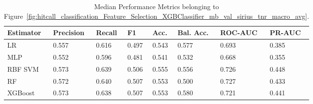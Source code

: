 \begin{longtable}{llllllll}
\caption{Median Performance Metrics belonging to Figure~\ref{fig:hitcall_classification_Feature_Selection_XGBClassifier_mb_val_sirius_tnr_macro_avg}.}\label{tab:table:hitcall_classification_feature_selection_xgbclassifier_mb_val_sirius_tnr_macro_avg}\\
\toprule
\midrule
\small Estimator & \small Precision & \small Recall & \small F1 & \small Acc. & \small Bal. Acc. & \small ROC-AUC & \small PR-AUC\\
\hline
LR & 0.557 & 0.616 & 0.497 & 0.543 & 0.577 & 0.693 & 0.385\\
MLP & 0.552 & 0.596 & 0.481 & 0.541 & 0.532 & 0.668 & 0.355\\
RBF SVM & 0.573 & 0.639 & 0.506 & 0.555 & 0.556 & 0.726 & 0.448\\
RF & 0.572 & 0.640 & 0.507 & 0.553 & 0.500 & 0.727 & 0.433\\
XGBoost & 0.573 & 0.638 & 0.507 & 0.553 & 0.580 & 0.721 & 0.441\\
\bottomrule
\end{longtable}